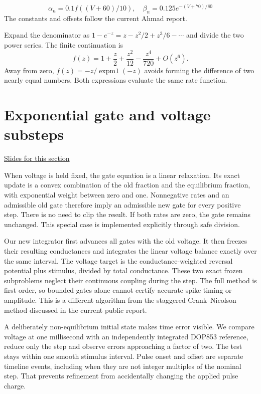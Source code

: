 \documentclass[11pt,letterpaper]{article}
\theoremstyle{definition}\newtheorem{definition}{Definition}\newtheorem{example}{Example}
\numberwithin{equation}{section}
\begin{document}
\[
\alpha_n=0.1f((V+60)/10),\quad\beta_n=0.125e^{-(V+70)/80}
\]
The constants and offsets follow the current Ahmad report.

Expand the denominator as $1-e^{-z}=z-z^2/2+z^3/6-\cdots$ and divide the two power series. The finite continuation is
\[
 f(z)=1+\frac z2+\frac{z^2}{12}-\frac{z^4}{720}+O(z^6).
\]
Away from zero, $f(z)=-z/\operatorname{expm1}(-z)$ avoids forming the difference of two nearly equal numbers. Both expressions evaluate the same rate function.
\section{Exponential gate and voltage substeps}
\hypertarget{note-exponential-gate-and-voltage-substeps}{}\label{note:exponential-gate-and-voltage-substeps}
{\small \href{slides.html\#frame=an-exact-frozen-voltage-gate-step\&step=1}{Slides for this section}}\par
When voltage is held fixed, the gate equation is a linear relaxation. Its exact update is a convex combination of the old fraction and the equilibrium fraction, with exponential weight between zero and one. Nonnegative rates and an admissible old gate therefore imply an admissible new gate for every positive step. There is no need to clip the result. If both rates are zero, the gate remains unchanged. This special case is implemented explicitly through safe division.

Our new integrator first advances all gates with the old voltage. It then freezes their resulting conductances and integrates the linear voltage balance exactly over the same interval. The voltage target is the conductance-weighted reversal potential plus stimulus, divided by total conductance. These two exact frozen subproblems neglect their continuous coupling during the step. The full method is first order, so bounded gates alone cannot certify accurate spike timing or amplitude. This is a different algorithm from the staggered Crank--Nicolson method discussed in the current public report.

A deliberately non-equilibrium initial state makes time error visible. We compare voltage at one millisecond with an independently integrated DOP853 reference, reduce only the step and observe errors approaching a factor of two. The test stays within one smooth stimulus interval. Pulse onset and offset are separate timeline events, including when they are not integer multiples of the nominal step. That prevents refinement from accidentally changing the applied pulse charge.
\end{document}
